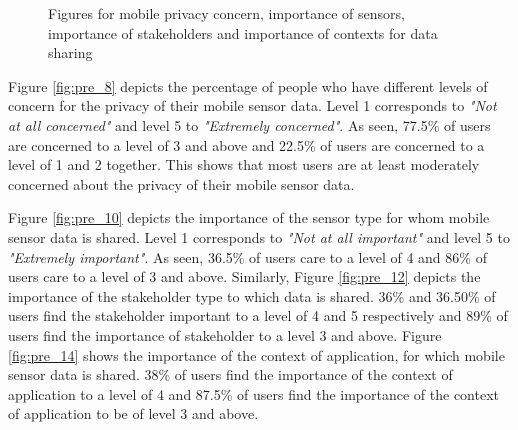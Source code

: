 \begin{figure}[htp]
\caption{Figures for mobile privacy concern, importance of sensors, importance of stakeholders and importance of contexts for data sharing}
\label{fig:st3}
\end{figure}

Figure \ref{fig:pre_8} depicts the percentage of people who have different levels of concern for the privacy of their mobile sensor data. Level 1 corresponds to \textit{"Not at all concerned"} and level 5 to \textit{"Extremely concerned"}. As seen, 77.5\% of users are concerned to a level of 3 and above and 22.5\% of users are concerned to a level of 1 and 2 together. This shows that most users are at least moderately concerned about the privacy of their mobile sensor data.

Figure \ref{fig:pre_10} depicts the importance of the sensor type for whom mobile sensor data is shared. Level 1 corresponds to \textit{"Not at all important"} and level 5 to \textit{"Extremely important"}. As seen, 36.5\% of users care to a level of 4 and 86\% of users care to a level of 3 and above. Similarly, Figure \ref{fig:pre_12} depicts the importance of the stakeholder type to which data is shared. 36\% and 36.50\% of users find the stakeholder important to a level of 4 and 5 respectively and 89\% of users find the importance of stakeholder to a level 3 and above. Figure \ref{fig:pre_14} shows the importance of the context of application, for which mobile sensor data is shared. 38\% of users find the importance of the context of application to a level of 4 and 87.5\% of users find the importance of the context of application to be of level 3 and above.

